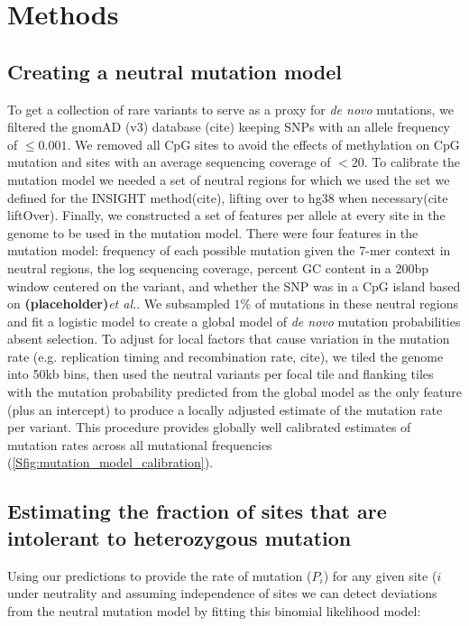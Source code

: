 \documentclass[11pt]{article}
\newcommand{\placeholder}{\textbf{(placeholder)}}
\begin{document}
\section*{Methods}
\label{sec:materials:methods}
\subsection*{Creating a neutral mutation model}

To get a collection of rare variants to serve as a proxy for \textit{de novo} mutations, we filtered the gnomAD (v3) database (cite) keeping SNPs with an allele frequency of $\leq 0.001$. We removed all CpG sites to avoid the effects of methylation on CpG mutation and sites with an average sequencing coverage of $<20$. To calibrate the mutation model we needed a set of neutral regions for which we used the set we defined for the INSIGHT method(cite), lifting over to hg38 when necessary(cite liftOver). Finally, we constructed a set of features per allele at every site in the genome to be used in the mutation model. There were four features in the mutation model: frequency of each possible mutation given the 7-mer context in neutral regions, the log sequencing coverage, percent GC content in a 200bp window centered on the variant, and whether the SNP was in a CpG island based on \placeholder \textit{et al.}. We subsampled $1\%$ of mutations in these neutral regions and fit a logistic model to create a global model of \textit{de novo} mutation probabilities absent selection. To adjust for local factors that cause variation in the mutation rate (e.g. replication timing and recombination rate, cite), we tiled the genome into 50kb bins, then used the neutral variants per focal tile and flanking tiles with the mutation probability predicted from the global model as the only feature (plus an intercept) to produce a locally adjusted estimate of the mutation rate per variant. This procedure provides globally well calibrated estimates of mutation rates across all mutational frequencies (\ref{Sfig:mutation_model_calibration}).

\subsection*{Estimating the fraction of sites that are intolerant to heterozygous mutation}
Using our predictions to provide the rate of mutation ($P_i$) for any given site ($i$ under neutrality and assuming independence of sites we can detect deviations from the neutral mutation model by fitting this binomial likelihood model:
\end{document}
